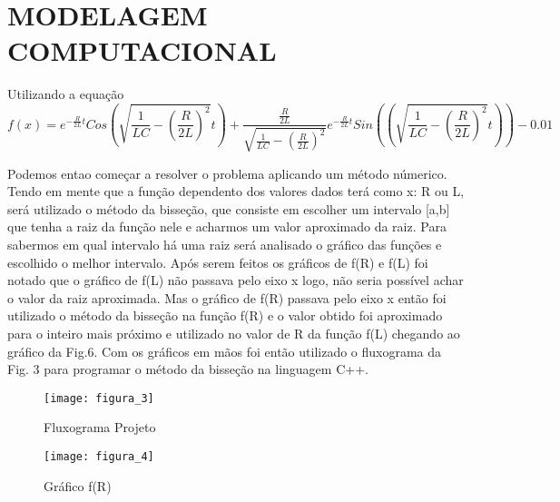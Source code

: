 \documentclass[12pt,fleqn]{article}
\begin{document}
\section{MODELAGEM COMPUTACIONAL}
Utilizando a equação
\begin{equation}
f(x)=e^{-\frac{R}{2L}t}Cos\left ( \sqrt{\frac{1}{LC}-\left ( \frac{R}{2L} \right )^{2}} t\right )+\frac{\frac{R}{2L}}{\sqrt{\frac{1}{LC}-\left ( \frac{R}{2L} \right )^{2}}}e^{-\frac{R}{2L}t}Sin(\left ( \sqrt{\frac{1}{LC}-\left ( \frac{R}{2L} \right )^{2}} t\right ))-0.01
\label{eq}
\end{equation}

Podemos entao começar a resolver o problema aplicando um método númerico\cite{chapra2008metodos}.
\vspace{0.5cm}
Tendo em mente que a função dependento dos valores dados terá como x: R ou L, será utilizado o método da bisseção, que consiste em escolher um intervalo [a,b] que tenha a raiz da função nele e acharmos um valor aproximado da raiz. Para sabermos em qual intervalo há uma raiz será analisado o gráfico das funções e escolhido o melhor intervalo.
\vspace{0.5cm}
Após serem feitos os gráficos de f(R) e f(L) foi notado que o gráfico de f(L) não passava pelo eixo x logo, não seria possível achar o valor da raiz aproximada. Mas o gráfico de f(R) passava pelo eixo x então foi utilizado o método da bisseção na função f(R) e o valor obtido foi aproximado para o inteiro mais próximo e utilizado no valor de R da função f(L) chegando ao gráfico da Fig.6. 
\vspace{0.5cm}
Com os gráficos em mãos foi então utilizado o fluxograma da Fig. 3 para programar o método da bisseção na linguagem C++.

\begin{figure}[H] %
\vspace{-2pt}
\begin{center}
\texttt{[image: figura\_3]}%
\caption{Fluxograma Projeto}
\label{fig3}%
\end{center}
\end{figure}

\begin{figure}[H] %
\vspace{-2pt}
\begin{center}
\texttt{[image: figura\_4]}%
\caption{Gráfico f(R)}
\label{fig4}%
\end{center}
\end{figure}
\end{document}
